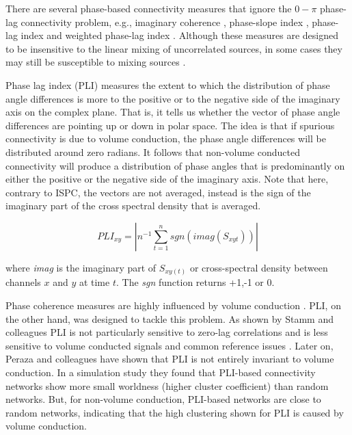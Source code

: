 \documentclass[11pt, onecolumn]{article}
\begin{document}
There are several phase-based connectivity measures that ignore the $0-\pi$ phase-lag connectivity problem, e.g., imaginary coherence \citep{nolte2004identifying}, phase-slope index \citep{nolte2008robustly}, phase-lag index \citep{stam2007phase} and weighted phase-lag index \cite{vinck2011improved}. Although these measures are designed to be insensitive to the linear mixing of uncorrelated sources, in
some cases they may still be susceptible to mixing sources \citep{peraza2012volume}.

Phase lag index (PLI) measures the extent to which the distribution of phase angle differences is more to the positive or to the negative side of the imaginary axis on the complex plane. That is, it tells us whether the vector of phase angle differences are pointing up or down in polar space. The idea is that if spurious connectivity is due to volume conduction, the phase angle differences will be distributed around zero radians. It follows that non-volume conducted connectivity will produce a distribution of phase angles that is predominantly on either the positive or the negative side of the imaginary axis. Note that here, contrary to ISPC, the vectors are not averaged, instead is the sign of the imaginary part of the cross spectral density that is averaged.

\begin{equation}
PLI_{xy} = |n^{-1} \sum_{t=1}^{n}sgn(imag(S_{xyt}))|
\label{eq:pli}
\end{equation}

where \textit{imag} is the imaginary part of $S_{xy(t)}$ or cross-spectral density between channels $x$ and $y$ at time $t$.
The \textit{sgn} function returns +1,-1 or 0. %

Phase coherence measures are highly influenced by volume conduction  \citep{mormann2000mean}. 
PLI, on the other hand, was designed to tackle this problem. As shown by Stamm and colleagues PLI is not particularly sensitive to zero-lag correlations and is less sensitive to volume conducted signals and common reference issues \cite{stam2007phase}.
Later on, Peraza and colleagues \citep{peraza2012volume} have shown  that PLI is not entirely invariant to volume conduction. In a simulation study they found that PLI-based connectivity networks show more small worldness (higher cluster coefficient) than random networks. But, for non-volume conduction, PLI-based networks are close to random networks, indicating that the high clustering shown for PLI is caused by volume conduction. 
\end{document}
